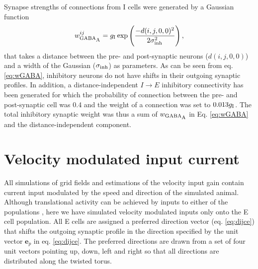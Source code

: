 \documentclass[a4paper,12pt]{article}
\newcommand{\ssc}[3]{\ensuremath{#1_{\text{#2}_{\text{#3}}}}}
\newcommand{\wGABAA  }{\ssc{w}      {\scriptsize{GABA}}{\scriptsize{A}}}
\newcommand{\sigmasub}[1]{\ssc{\sigma}{\scriptsize{#1}}{}}
\newcommand{\gI      }{\ssc{g}      {\scriptsize{I}}{}}
\newcommand{\dijzz}{\ensuremath{d(i, j, 0, 0)}}
\begin{document}
Synapse strengths of connections from I cells were generated by a Gaussian
function
\begin{equation}
    \wGABAA^{ij} = \gI \exp\left(\frac{-d(i, j, 0, 0)^2}{2 \sigmasub{inh}^2}\right),
    \label{eq:wGABA}
\end{equation}
that takes a distance between the pre- and post-synaptic neurons (\dijzz) and a
width of the Gaussian (\sigmasub{inh}) as parameters. As can be seen from eq.
\eqref{eq:wGABA}, inhibitory neurons do not have shifts in their outgoing
synaptic profiles. In addition, a distance-independent $I \rightarrow E$
inhibitory connectivity has been generated for which the probability of connection
between the pre- and post-synaptic cell was 0.4 and the weight of a connection
was set to $0.013\gI$. The total inhibitory synaptic weight was thus a sum of
$\wGABAA$ in Eq. \eqref{eq:wGABA} and the distance-independent component.





\section{Velocity modulated input current } \label{sec:Ivel}

All simulations of grid fields and estimations of the velocity input gain
contain current input modulated by the speed and direction of the simulated
animal. Although translational activity can be achieved by inputs to either of
the populations \citep{Pastoll:2013ff}, here we have simulated velocity
modulated inputs only onto the E cell population. All E cells are assigned a
preferred direction vector (eq. \ref{eq:dijce}) that shifts the outgoing
synaptic profile in the direction specified by the unit vector $\mathbf{e}_p$
in eq. \eqref{eq:dijce}. The preferred directions are drawn from a set of four
unit vectors pointing up, down, left and right so that all directions are
distributed along the twisted torus.
\end{document}
